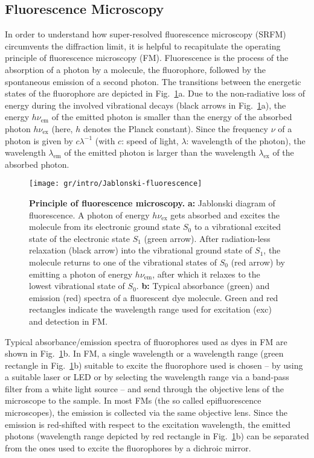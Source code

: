 
\subsection{Fluorescence Microscopy}
\label{sec:fm}
In order to understand how super-resolved fluorescence microscopy (SRFM)
circumvents the diffraction limit, it is helpful to recapitulate the operating
principle of fluorescence microscopy (FM). Fluorescence is the process of the
absorption of a photon by a molecule, the fluorophore, followed by the
spontaneous emission of a second photon. The transitions between the energetic
states of the fluorophore are depicted in
Fig.~\ref{fig:jablonski-fluorescence}a. Due to the non-radiative loss of
energy during the involved vibrational decays (black arrows in
Fig.~\ref{fig:jablonski-fluorescence}a), the energy $h\nu_\text{em}$ of the
emitted photon is smaller than the energy of the absorbed photon
$h\nu_\text{ex}$ (here, $h$ denotes the Planck constant). Since the frequency $\nu$
of a photon is given by $c\lambda^{-1}$ (with $c$: speed of light, $\lambda$:
wavelength of the photon), the wavelength $\lambda_\text{em}$ of the emitted
photon is larger than the wavelength $\lambda_\text{ex}$ of the absorbed
photon.      

\begin{figure}
  \centering
  \texttt{[image: gr/intro/Jablonski-fluorescence]}
  
  \caption{%
    \textbf{Principle of fluorescence microscopy.}  \textbf{a:} Jablonski
    diagram of fluorescence. A photon of energy $h\nu_\text{ex}$ gets absorbed
    and excites the molecule from its electronic ground state $S_0$ to a
    vibrational excited state of the electronic state $S_1$ (green
    arrow). After radiation-less relaxation (black arrow) into the vibrational
    ground state of $S_1$, the molecule returns to one of the vibrational
    states of $S_0$ (red arrow) by emitting a photon of energy
    $h\nu_\text{em}$, after which it relaxes to the lowest vibrational state
    of $S_0$.  \textbf{b:} Typical absorbance (green) and emission (red)
    spectra of a fluorescent dye molecule. Green and red rectangles indicate
    the wavelength range used for excitation (exc) and detection in FM.  }
  \label{fig:jablonski-fluorescence}
\end{figure}

Typical absorbance/emission spectra of fluorophores used as dyes in FM are
shown in Fig.~\ref{fig:jablonski-fluorescence}b. In FM, a single wavelength or
a wavelength range (green rectangle in Fig.~\ref{fig:jablonski-fluorescence}b) 
suitable to excite the fluorophore used is chosen -- by using a suitable laser
or LED or by selecting the wavelength range via a band-pass filter from a
white light source -- and send through the objective lens of the microscope to
the sample. In most FMs (the so called epifluorescence microscopes), the
emission is collected via the same objective lens. Since the emission is
red-shifted with respect to the excitation wavelength, the emitted photons
(wavelength range depicted by red rectangle in
Fig.~\ref{fig:jablonski-fluorescence}b) can be separated from the ones used to
excite the fluorophores by a dichroic mirror.

